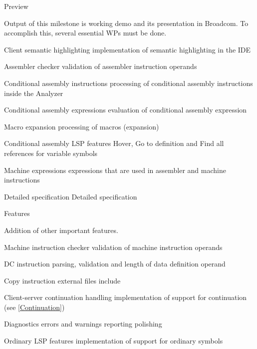 	
	\itemm \label{milestone_preview} Preview 
	
		\small Output of this milestone is working demo and its presentation in Broadcom. To accomplish this, several essential WPs must be done.
		
		\bwp
			\itemwp Client semantic highlighting 
					\tiny implementation of semantic highlighting in the IDE
					
			\itemwp Assembler checker 
					\tiny validation of assembler instruction operands
					
			\itemwp Conditional assembly instructions 
					\tiny processing of conditional assembly instructions inside the Analyzer
					
			\itemwp Conditional assembly expressions 
					\tiny evaluation of conditional assembly expression 
					
			\itemwp Macro expansion 
					\tiny processing of macros (expansion)
					
			\itemwp Conditional assembly LSP features 
					\tiny Hover, Go to definition and Find all references for variable symbols
					
			\itemwp Machine expressions 
					\tiny expressions that are used in assembler and machine instructions
		\eenum
	
	
	\itemm Detailed specification 
		\bwp
			\itemwp Detailed specification 
		\eenum
	
	
	\itemm Features 
	
		\small Addition of other important features.
		
		\bwp
			\itemwp Machine instruction checker 
					\tiny validation of machine instruction operands
					
			\itemwp DC instruction 
					\tiny parsing, validation and length of data definition operand
					
			\itemwp Copy instruction 
					\tiny external files include
					
			\itemwp Client-server continuation handling 
					\tiny implementation of support for continuation (see \cref{Continuation})
			
			\itemwp Diagnostics 
					\tiny errors and warnings reporting polishing
					
			\itemwp Ordinary LSP features 
					\tiny implementation of support for ordinary symbols
					

